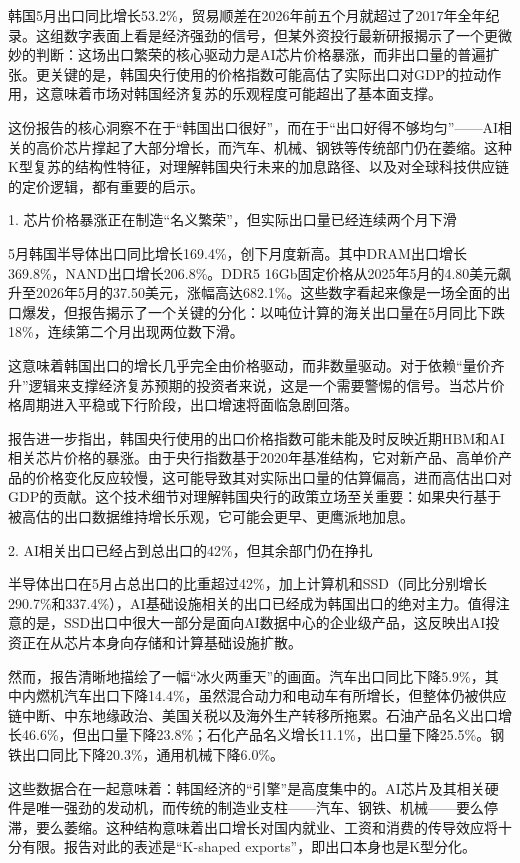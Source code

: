 \documentclass[11pt]{ctexart}
\begin{document}
韩国5月出口同比增长53.2\%，贸易顺差在2026年前五个月就超过了2017年全年纪录。这组数字表面上看是经济强劲的信号，但某外资投行最新研报揭示了一个更微妙的判断：这场出口繁荣的核心驱动力是AI芯片价格暴涨，而非出口量的普遍扩张。更关键的是，韩国央行使用的价格指数可能高估了实际出口对GDP的拉动作用，这意味着市场对韩国经济复苏的乐观程度可能超出了基本面支撑。

这份报告的核心洞察不在于“韩国出口很好”，而在于“出口好得不够均匀”——AI相关的高价芯片撑起了大部分增长，而汽车、机械、钢铁等传统部门仍在萎缩。这种K型复苏的结构性特征，对理解韩国央行未来的加息路径、以及对全球科技供应链的定价逻辑，都有重要的启示。

1. 芯片价格暴涨正在制造“名义繁荣”，但实际出口量已经连续两个月下滑

5月韩国半导体出口同比增长169.4\%，创下月度新高。其中DRAM出口增长369.8\%，NAND出口增长206.8\%。DDR5 16Gb固定价格从2025年5月的4.80美元飙升至2026年5月的37.50美元，涨幅高达682.1\%。这些数字看起来像是一场全面的出口爆发，但报告揭示了一个关键的分化：以吨位计算的海关出口量在5月同比下跌18\%，连续第二个月出现两位数下滑。

这意味着韩国出口的增长几乎完全由价格驱动，而非数量驱动。对于依赖“量价齐升”逻辑来支撑经济复苏预期的投资者来说，这是一个需要警惕的信号。当芯片价格周期进入平稳或下行阶段，出口增速将面临急剧回落。

报告进一步指出，韩国央行使用的出口价格指数可能未能及时反映近期HBM和AI相关芯片价格的暴涨。由于央行指数基于2020年基准结构，它对新产品、高单价产品的价格变化反应较慢，这可能导致其对实际出口量的估算偏高，进而高估出口对GDP的贡献。这个技术细节对理解韩国央行的政策立场至关重要：如果央行基于被高估的出口数据维持增长乐观，它可能会更早、更鹰派地加息。

2. AI相关出口已经占到总出口的42\%，但其余部门仍在挣扎

半导体出口在5月占总出口的比重超过42\%，加上计算机和SSD（同比分别增长290.7\%和337.4\%），AI基础设施相关的出口已经成为韩国出口的绝对主力。值得注意的是，SSD出口中很大一部分是面向AI数据中心的企业级产品，这反映出AI投资正在从芯片本身向存储和计算基础设施扩散。

然而，报告清晰地描绘了一幅“冰火两重天”的画面。汽车出口同比下降5.9\%，其中内燃机汽车出口下降14.4\%，虽然混合动力和电动车有所增长，但整体仍被供应链中断、中东地缘政治、美国关税以及海外生产转移所拖累。石油产品名义出口增长46.6\%，但出口量下降23.8\%；石化产品名义增长11.1\%，出口量下降25.5\%。钢铁出口同比下降20.3\%，通用机械下降6.0\%。

这些数据合在一起意味着：韩国经济的“引擎”是高度集中的。AI芯片及其相关硬件是唯一强劲的发动机，而传统的制造业支柱——汽车、钢铁、机械——要么停滞，要么萎缩。这种结构意味着出口增长对国内就业、工资和消费的传导效应将十分有限。报告对此的表述是“K-shaped exports”，即出口本身也是K型分化。
\end{document}

